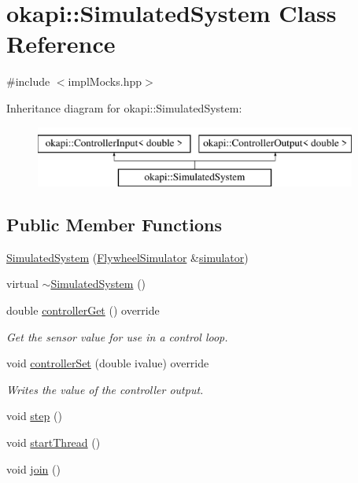 \hypertarget{classokapi_1_1SimulatedSystem}{}\section{okapi\+::Simulated\+System Class Reference}
\label{classokapi_1_1SimulatedSystem}


{\ttfamily \#include $<$impl\+Mocks.\+hpp$>$}

Inheritance diagram for okapi\+::Simulated\+System\+:\begin{figure}[H]
\begin{center}
\leavevmode
\includegraphics[height=2.000000cm]{classokapi_1_1SimulatedSystem}
\end{center}
\end{figure}
\subsection*{Public Member Functions}
\begin{DoxyCompactItemize}
\item 
\mbox{\hyperlink{classokapi_1_1SimulatedSystem_ad0f05b4fb5112a490493040b11b8bea3}{Simulated\+System}} (\mbox{\hyperlink{classokapi_1_1FlywheelSimulator}{Flywheel\+Simulator}} \&\mbox{\hyperlink{classokapi_1_1SimulatedSystem_a8a0976ed11f951daf4edbca13e0fa6a5}{simulator}})
\item 
virtual \mbox{\hyperlink{classokapi_1_1SimulatedSystem_a8359c1f9e43efe92c93de1be557df0ed}{$\sim$\+Simulated\+System}} ()
\item 
double \mbox{\hyperlink{classokapi_1_1SimulatedSystem_a877047f36bb429021097e620afccc316}{controller\+Get}} () override
\begin{DoxyCompactList}\small\item\em Get the sensor value for use in a control loop. \end{DoxyCompactList}\item 
void \mbox{\hyperlink{classokapi_1_1SimulatedSystem_a06c467bf5d10a81ecee83f4b7203fc84}{controller\+Set}} (double ivalue) override
\begin{DoxyCompactList}\small\item\em Writes the value of the controller output. \end{DoxyCompactList}\item 
void \mbox{\hyperlink{classokapi_1_1SimulatedSystem_aecec1a112c3e779a3d7e901bb2e7923b}{step}} ()
\item 
void \mbox{\hyperlink{classokapi_1_1SimulatedSystem_a32abbe4bc680eacad54a686b3be7df79}{start\+Thread}} ()
\item 
void \mbox{\hyperlink{classokapi_1_1SimulatedSystem_a1c62c7150ebd409174d5eecf2d30f7ee}{join}} ()
\end{DoxyCompactItemize}
